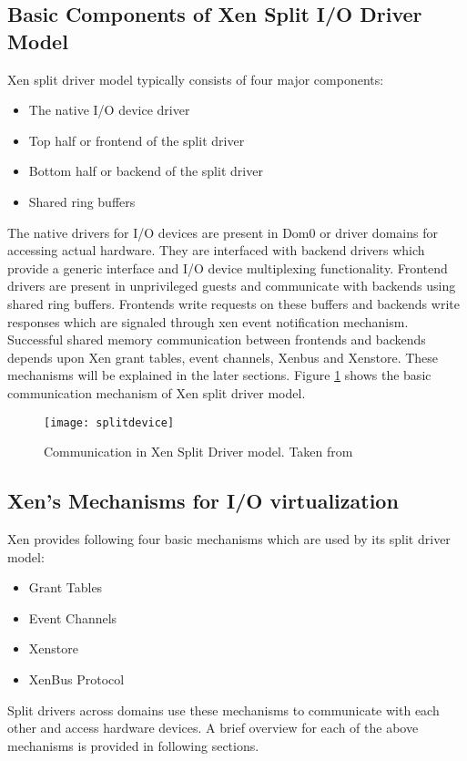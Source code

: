 \subsection{Basic Components of Xen Split I/O Driver Model\label{sec:basiccomp}}
Xen split driver model typically consists of four major components:
\begin{itemize}
	\item The native I/O device driver
	\item Top half or frontend of the split driver
	\item Bottom half or backend of the split driver
	\item Shared ring buffers
\end{itemize}

The native drivers for I/O devices are present in Dom0 or driver domains for accessing actual hardware. They are interfaced with backend drivers which provide a generic interface and I/O device multiplexing functionality. Frontend drivers are present in unprivileged guests and communicate with backends using shared ring buffers. Frontends write requests on these buffers and backends write responses which are signaled through xen event notification mechanism. Successful shared memory communication between frontends and backends depends upon Xen grant tables, event channels, Xenbus and Xenstore. These mechanisms will be explained in the later sections. Figure \ref{splitdevice} shows the basic communication mechanism of Xen split driver model.
\begin{figure}[!htbp]
	\centering
	\texttt{[image: splitdevice]}
	\caption{Communication in Xen Split Driver model. Taken from \cite{xen_slides}}
	\label{splitdevice}
\end{figure}

\subsection{Xen's Mechanisms for I/O virtualization \label{sec:basicmech}}
Xen provides following four basic mechanisms which are used by its split driver model:
\begin{itemize}
	\item Grant Tables
	\item Event Channels
    \item Xenstore
	\item XenBus Protocol
\end{itemize}
Split drivers across domains use these mechanisms to communicate with each other and access hardware devices. A brief overview for each of the above mechanisms is provided in following sections.

